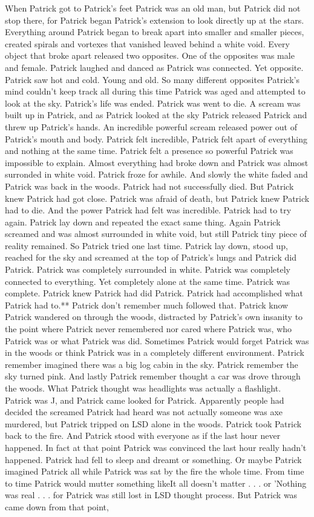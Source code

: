 \documentclass[12pt]{book}
\begin{document}
When Patrick got to Patrick's feet Patrick was an old man, but Patrick did not stop there, for Patrick began Patrick's extension to look directly up at the stars. Everything around Patrick began to break apart into smaller and smaller pieces, created spirals and vortexes that vanished leaved behind a white void. Every object that broke apart released two opposites. One of the opposites was male and female. Patrick laughed and danced as Patrick was connected. Yet opposite. Patrick saw hot and cold. Young and old. So many different opposites Patrick's mind couldn't keep track all during this time Patrick was aged and attempted to look at the sky. Patrick's life was ended. Patrick was went to die. A scream was built up in Patrick, and as Patrick looked at the sky Patrick released Patrick and threw up Patrick's hands. An incredible powerful scream released power out of Patrick's mouth and body. Patrick felt incredible, Patrick felt apart of everything and nothing at the same time. Patrick felt a presence so powerful Patrick was impossible to explain. Almost everything had broke down and Patrick was almost surronded in white void. Patrick froze for awhile. And slowly the white faded and Patrick was back in the woods. Patrick had not successfully died. But Patrick knew Patrick had got close. Patrick was afraid of death, but Patrick knew Patrick had to die. And the power Patrick had felt was incredible. Patrick had to try again. Patrick lay down and repeated the exact same thing. Again Patrick screamed and was almost surrounded in white void, but still Patrick tiny piece of reality remained. So Patrick tried one last time. Patrick lay down, stood up, reached for the sky and screamed at the top of Patrick's lungs and Patrick did Patrick. Patrick was completely surrounded in white. Patrick was completely connected to everything. Yet completely alone at the same time. Patrick was complete. Patrick knew Patrick had did Patrick. Patrick had accomplished what Patrick had to.** Patrick don't remember much followed that. Patrick know Patrick wandered on through the woods, distracted by Patrick's own insanity to the point where Patrick never remembered nor cared where Patrick was, who Patrick was or what Patrick was did. Sometimes Patrick would forget Patrick was in the woods or think Patrick was in a completely different environment. Patrick remember imagined there was a big log cabin in the sky. Patrick remember the sky turned pink. And lastly Patrick remember thought a car was drove through the woods. What Patrick thought was headlights was actually a flashlight. Patrick was J, and Patrick came looked for Patrick. Apparently people had decided the screamed Patrick had heard was not actually someone was axe murdered, but Patrick tripped on LSD alone in the woods. Patrick took Patrick back to the fire. And Patrick stood with everyone as if the last hour never happened. In fact at that point Patrick was convinced the last hour really hadn't happened. Patrick had fell to sleep and dreamt or something. Or maybe Patrick imagined Patrick all while Patrick was sat by the fire the whole time. From time to time Patrick would mutter something likeIt all doesn't matter . . .  or 'Nothing was real . . .  for Patrick was still lost in LSD thought process. But Patrick was came down from that point, 
\end{document}

